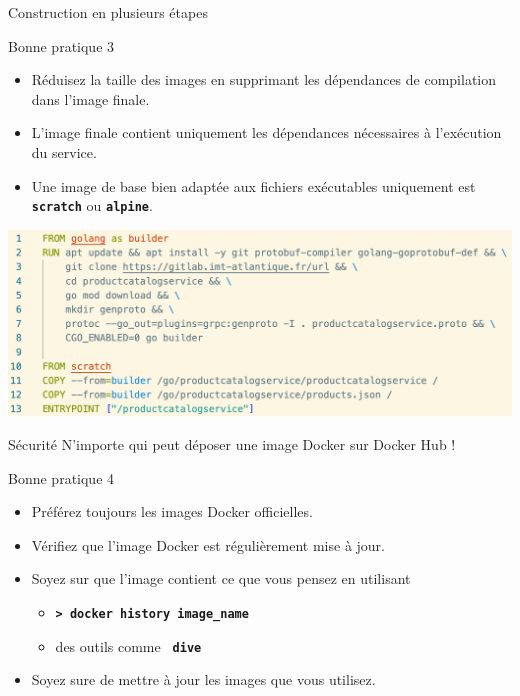 \documentclass[aspectratio=169,10pt]{beamer}
\begin{document}
\begin{frame}{Construction en plusieurs étapes}

\begin{alertblock}{Bonne pratique 3}
\begin{itemize}
    \item Réduisez la taille des images en supprimant les dépendances de compilation dans l'image finale.
    \item L'image finale contient uniquement les dépendances nécessaires à l'exécution du service.
    \item Une image de base bien adaptée aux fichiers exécutables uniquement est \texttt{\textbf{scratch}} ou \texttt{\textbf{alpine}}.
\end{itemize}
\end{alertblock}


\begin{center}
    \includegraphics[scale=0.25]{images/dockerfile.png}
\end{center}

\end{frame}


\begin{frame}{Sécurité}
\alert{N'importe qui peut déposer une image Docker sur Docker Hub !}

\begin{alertblock}{Bonne pratique 4}
\begin{itemize}
    \item Préférez toujours les images Docker officielles.
    \item Vérifiez que l'image Docker est régulièrement mise à jour.
    \item Soyez sur que l'image contient ce que vous pensez en utilisant 
    \begin{itemize}
        \item \texttt{\textbf{> docker history image\_name}}
        \item des outils comme \texttt{\textbf{\color{blue} dive}}
    \end{itemize}
    \item Soyez sure de mettre à jour les images que vous utilisez.
\end{itemize}
\end{alertblock}

\end{frame}
\end{document}
